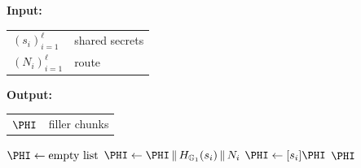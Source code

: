 \caption{Preprocessing}%
\begin{algorithmic}[1]

\Statex \textbf{Input:}
\Statex \quad
  \begin{tabular}{@{}ll@{}}
    $(s_i)_{i=1}^{\ell}$ & shared secrets \\
    $(N_i)_{i=1}^{\ell}$ & route 
  \end{tabular}
\Statex \textbf{Output:} 
\Statex \quad
  \begin{tabular}{@{}ll@{}}
    $\PHI$ & \hspace{8.5mm} filler chunks \\
  \end{tabular}
\Statex

\State $\PHI \gets \text{empty list}$
    \State $\PHI \gets
        \PHI \,\Vert\, H_{\mathbb{G}_1}(s_i) \,\Vert\, N_i $
    \State $\PHI \gets [s_i]\PHI$
\EndFor
\State \Return $\PHI$

\end{algorithmic}